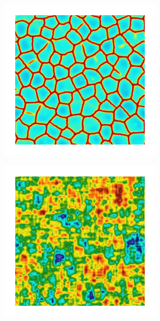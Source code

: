 \begin{figure}[!htb]
\begin{subfigure}[b]{0.15\textwidth}
    \caption{}
    \label{fig: Chapter4/2D/psic_sqexp_cartesian_5_5_rho_0_seed_e}
  \end{subfigure}
  \begin{subfigure}[b]{0.15\textwidth}
    \includegraphics[width=\textwidth]{Chapter4/figures/2D/d_sqexp_cartesian_5_5_rho_0_seed_e.png}
    \caption{}
    \label{fig: Chapter4/2D/d_sqexp_cartesian_5_5_rho_0_seed_e}
  \end{subfigure}
  \begin{subfigure}[b]{0.15\textwidth}
    \includegraphics[width=\textwidth]{Chapter4/figures/2D/Gc_exp_cartesian_5_5_rho_0_seed_e.png}

\end{subfigure}
\end{figure}
